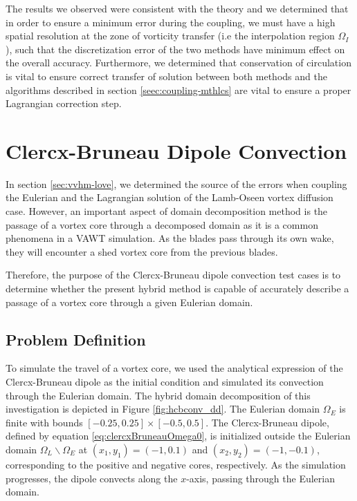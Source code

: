 The results we observed were consistent with the theory and we determined that in order to ensure a minimum error during the coupling, we must have a high spatial resolution at the zone of vorticity transfer (i.e the interpolation region $\Omega_I$), such that the discretization error of the two methods have minimum effect on the overall accuracy. Furthermore, we determined that conservation of circulation is vital to ensure correct transfer of solution between both methods and the algorithms described in section \ref{seec:coupling-mthlcs} are vital to ensure a proper Lagrangian correction step. 

\section{Clercx-Bruneau Dipole Convection}
\label{sec:vvhm-cbdc}

In section \ref{sec:vvhm-love}, we determined the source of the errors when coupling the Eulerian and the Lagrangian solution of the Lamb-Oseen vortex diffusion case. However, an important aspect of domain decomposition method is the passage of a vortex core through a decomposed domain as it is a common phenomena in a VAWT simulation. As the blades pass through its own wake, they will encounter a shed vortex core from the previous blades. 

Therefore, the purpose of the Clercx-Bruneau dipole convection test cases is to determine whether the present hybrid method is capable of accurately describe a passage of a vortex core through a given Eulerian domain.

\subsection{Problem Definition}

To simulate the travel of a vortex core, we used the analytical expression of the Clercx-Bruneau dipole \cite{Clercx2006a} as the initial condition and simulated its convection through the Eulerian domain. The hybrid domain decomposition of this investigation is depicted in Figure \ref{fig:hcbconv_dd}. The Eulerian domain $\Omega_E$ is finite with bounds $[-0.25,0.25]\times[-0.5,0.5]$. The Clercx-Bruneau dipole, defined by equation \ref{eq:clercxBruneauOmega0}, is initialized outside the Eulerian domain $\Omega_L\backslash\Omega_E$ at $(x_1,y_1) = (-1,0.1)$ and $(x_2,y_2)=(-1,-0.1)$, corresponding to the positive and negative cores, respectively. As the simulation progresses, the dipole convects along the $x$-axis, passing through the Eulerian domain.

